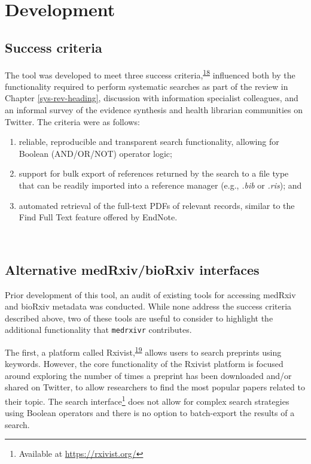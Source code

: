 \documentclass[a4paper, twoside]{templates/ociamthesis}
\begin{document}
\hypertarget{development}{%
\section{Development}\label{development}}

\hypertarget{success-criteria}{%
\subsection{Success criteria}\label{success-criteria}}

The tool was developed to meet three success criteria,\textsuperscript{\protect\hyperlink{ref-wateridge1995}{18}} influenced both by the functionality required to perform systematic searches as part of the review in Chapter \ref{sys-rev-heading}, discussion with information specialist colleagues, and an informal survey of the evidence synthesis and health librarian communities on Twitter. The criteria were as follows:

\begin{enumerate}
\def\labelenumi{\arabic{enumi}.}
\item
  reliable, reproducible and transparent search functionality, allowing for Boolean (AND/OR/NOT) operator logic;
\item
  support for bulk export of references returned by the search to a file type that can be readily imported into a reference manager (e.g., \emph{.bib} or \emph{.ris}); and
\item
  automated retrieval of the full-text PDFs of relevant records, similar to the Find Full Text feature offered by EndNote.
\end{enumerate}

~

\hypertarget{alternative-medrxivbiorxiv-interfaces}{%
\subsection{Alternative medRxiv/bioRxiv interfaces}\label{alternative-medrxivbiorxiv-interfaces}}

Prior development of this tool, an audit of existing tools for accessing medRxiv and bioRxiv metadata was conducted. While none address the success criteria described above, two of these tools are useful to consider to highlight the additional functionality that \texttt{medrxivr} contributes.

The first, a platform called Rxivist,\textsuperscript{\protect\hyperlink{ref-abdill2019}{19}} allows users to search preprints using keywords. However, the core functionality of the Rxivist platform is focused around exploring the number of times a preprint has been downloaded and/or shared on Twitter, to allow researchers to find the most popular papers related to their topic. The search interface\footnote{Available at \url{https://rxivist.org/}} does not allow for complex search strategies using Boolean operators and there is no option to batch-export the results of a search.
\end{document}
